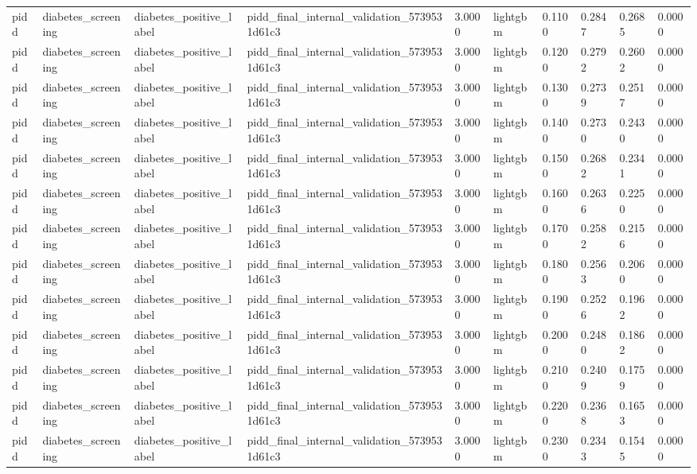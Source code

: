 \begin{tabular}{llllllllll}
pidd & diabetes\_screening & diabetes\_positive\_label & pidd\_final\_internal\_validation\_5739531d61c3 & 3.0000 & lightgbm & 0.1100 & 0.2847 & 0.2685 & 0.0000 \\
pidd & diabetes\_screening & diabetes\_positive\_label & pidd\_final\_internal\_validation\_5739531d61c3 & 3.0000 & lightgbm & 0.1200 & 0.2792 & 0.2602 & 0.0000 \\
pidd & diabetes\_screening & diabetes\_positive\_label & pidd\_final\_internal\_validation\_5739531d61c3 & 3.0000 & lightgbm & 0.1300 & 0.2739 & 0.2517 & 0.0000 \\
pidd & diabetes\_screening & diabetes\_positive\_label & pidd\_final\_internal\_validation\_5739531d61c3 & 3.0000 & lightgbm & 0.1400 & 0.2730 & 0.2430 & 0.0000 \\
pidd & diabetes\_screening & diabetes\_positive\_label & pidd\_final\_internal\_validation\_5739531d61c3 & 3.0000 & lightgbm & 0.1500 & 0.2682 & 0.2341 & 0.0000 \\
pidd & diabetes\_screening & diabetes\_positive\_label & pidd\_final\_internal\_validation\_5739531d61c3 & 3.0000 & lightgbm & 0.1600 & 0.2636 & 0.2250 & 0.0000 \\
pidd & diabetes\_screening & diabetes\_positive\_label & pidd\_final\_internal\_validation\_5739531d61c3 & 3.0000 & lightgbm & 0.1700 & 0.2582 & 0.2156 & 0.0000 \\
pidd & diabetes\_screening & diabetes\_positive\_label & pidd\_final\_internal\_validation\_5739531d61c3 & 3.0000 & lightgbm & 0.1800 & 0.2563 & 0.2060 & 0.0000 \\
pidd & diabetes\_screening & diabetes\_positive\_label & pidd\_final\_internal\_validation\_5739531d61c3 & 3.0000 & lightgbm & 0.1900 & 0.2526 & 0.1962 & 0.0000 \\
pidd & diabetes\_screening & diabetes\_positive\_label & pidd\_final\_internal\_validation\_5739531d61c3 & 3.0000 & lightgbm & 0.2000 & 0.2480 & 0.1862 & 0.0000 \\
pidd & diabetes\_screening & diabetes\_positive\_label & pidd\_final\_internal\_validation\_5739531d61c3 & 3.0000 & lightgbm & 0.2100 & 0.2409 & 0.1759 & 0.0000 \\
pidd & diabetes\_screening & diabetes\_positive\_label & pidd\_final\_internal\_validation\_5739531d61c3 & 3.0000 & lightgbm & 0.2200 & 0.2368 & 0.1653 & 0.0000 \\
pidd & diabetes\_screening & diabetes\_positive\_label & pidd\_final\_internal\_validation\_5739531d61c3 & 3.0000 & lightgbm & 0.2300 & 0.2343 & 0.1545 & 0.0000 \\

\end{tabular}
